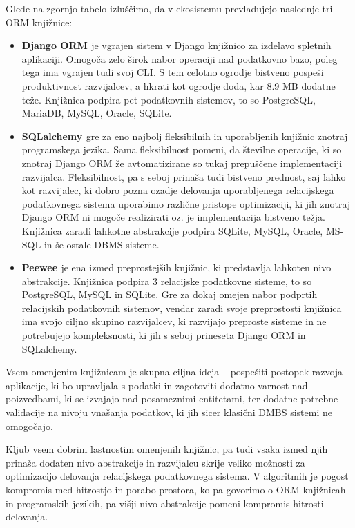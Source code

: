\documentclass[a4paper,12pt,openright]{book}
\begin{document}
    \noindent
    Glede na zgornjo tabelo izluščimo, da v ekosistemu prevladujejo naslednje tri ORM knjižnice:
    \begin{itemize}
        \item \textbf{Django ORM \cite{DJANGO_GITHUB}} je vgrajen sistem v Django knjižnico za izdelavo spletnih aplikaciji. Omogoča zelo širok nabor operaciji nad podatkovno bazo, poleg tega ima vgrajen tudi svoj CLI. S tem celotno ogrodje bistveno pospeši produktivnost razvijalcev, a hkrati kot ogrodje doda, kar 8.9 MB dodatne teže. Knjižnica podpira pet podatkovnih sistemov, to so PostgreSQL, MariaDB, MySQL, Oracle, SQLite.
        \item \textbf{SQLalchemy \cite{SQLALCHEMY_GITHUB}} gre za eno najbolj fleksibilnih in uporabljenih knjižnic znotraj programskega jezika. Sama fleksibilnost pomeni, da številne operacije, ki so znotraj Django ORM že avtomatizirane so tukaj prepuščene implementaciji razvijalca. Fleksibilnost, pa s seboj prinaša tudi bistveno prednost, saj lahko kot razvijalec, ki dobro pozna ozadje delovanja uporabljenega relacijskega podatkovnega sistema uporabimo različne pristope optimizaciji, ki jih znotraj Django ORM ni mogoče realizirati oz. je implementacija bistveno težja. Knjižnica zaradi lahkotne abstrakcije podpira SQLite, MySQL, Oracle, MS-SQL in še ostale DBMS sisteme.
        \item \textbf{Peewee \cite{PEEWEE_GITHUB}} je ena izmed preprostejših knjižnic, ki predstavlja lahkoten nivo abstrakcije. Knjižnica podpira 3 relacijske podatkovne sisteme, to so PostgreSQL, MySQL in SQLite. Gre za dokaj omejen nabor podprtih relacijskih podatkovnih sistemov, vendar zaradi svoje preprostosti knjižnica ima svojo ciljno skupino razvijalcev, ki razvijajo preproste sisteme in ne potrebujejo kompleksnosti, ki jih s seboj prineseta Django ORM in SQLalchemy.
    \end{itemize}

    \noindent
    Vsem omenjenim knjižnicam je skupna ciljna ideja – pospešiti postopek razvoja aplikacije, ki bo upravljala s podatki in zagotoviti dodatno varnost nad poizvedbami, ki se izvajajo nad posameznimi entitetami, ter dodatne potrebne validacije na nivoju vnašanja podatkov, ki jih sicer klasični DMBS sistemi ne omogočajo.

    Kljub vsem dobrim lastnostim omenjenih knjižnic, pa tudi vsaka izmed njih prinaša dodaten nivo abstrakcije in razvijalcu skrije veliko možnosti za optimizacijo delovanja relacijskega podatkovnega sistema. V algoritmih je pogost kompromis med hitrostjo in porabo prostora, ko pa govorimo o ORM knjižnicah in programskih jezikih, pa višji nivo abstrakcije pomeni kompromis hitrosti delovanja.
\end{document}
